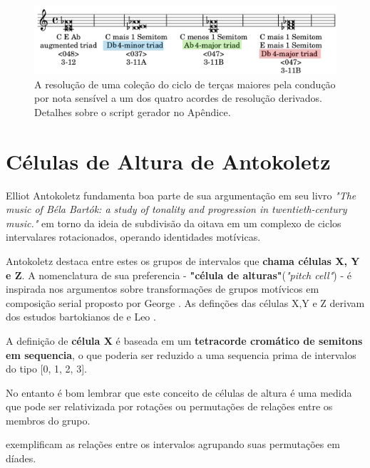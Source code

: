 \documentclass[
	12pt,				%
	openright,			%
	twoside,			%
	a4paper,			%
	english,			%
	french,				%
	spanish,			%
	brazil				%
	]{abntex2}
\begin{document}
\begin{figure}[!h]
	\caption{\label{fig_grafico}A resolução de uma coleção do ciclo de terças maiores pela condução por nota sensível a um dos quatro acordes de resolução derivados. Detalhes sobre o script gerador no Apêndice.   }
	\begin{center}
	    \includegraphics[scale=0.3]{ciclos/transpoe_triades_aumentadas.png}
	\end{center}
\end{figure}
\pagebreak



\section{Células de Altura de Antokoletz}

Elliot Antokoletz fundamenta boa parte de sua argumentação em seu livro \textit{"The music of Béla Bartók: a study of tonality and progression in twentieth-century music."}\cite{antokoletz1984music} em torno da ideia de subdivisão da oitava em um complexo de ciclos intervalares rotacionados, operando identidades motívicas. 

Antokoletz destaca entre estes os grupos de intervalos que \textbf{chama células X, Y e Z}\cite[ p.69-77]{antokoletz1984music}. A nomenclatura de sua preferencia - \textbf{"célula de alturas"}(\textit{"pitch cell"}) - é inspirada nos argumentos sobre transformações de grupos motívicos em composição serial proposto por George . As definções das células X,Y e Z derivam dos estudos bartokianos de  e Leo .

A definição de \textbf{célula X } é baseada em um \textbf{tetracorde cromático de semitons em sequencia}, o que poderia ser reduzido a uma sequencia prima de intervalos do tipo [0, 1, 2, 3]. 

No entanto é bom lembrar que este conceito de células de altura é uma medida que pode ser relativizada por rotações ou permutações de relações entre os membros do grupo.

 exemplificam as relações entre os intervalos agrupando suas permutações em díades.
\end{document}
